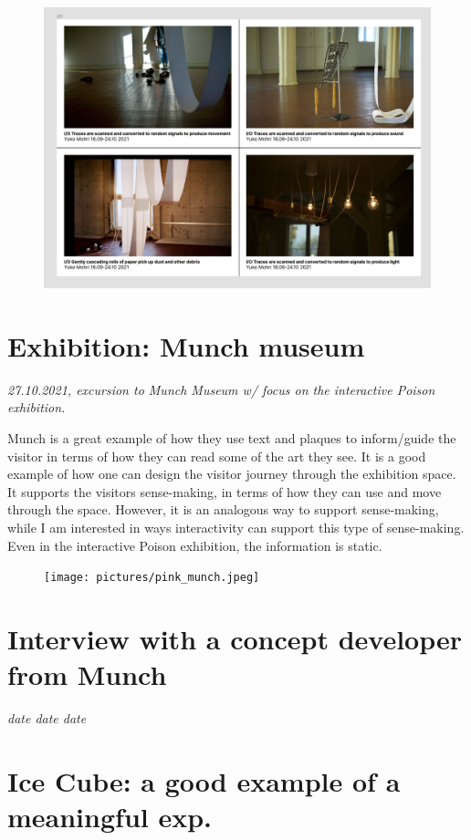 \begin{figure}[H]
\includegraphics[width=15cm]{pictures/yukomohri.png}
\centering 
\end{figure}

\section{Exhibition: Munch museum}
\par
\emph{27.10.2021, excursion to Munch Museum w/ focus on the interactive Poison exhibition.}
\par

Munch is a great example of how they use text and plaques to inform/guide the visitor in terms of how they can read some of the art they see. It is a good example of how one can design the visitor journey through the exhibition space. It supports the visitors sense-making, in terms of how they can use and move through the space. However, it is an analogous way to support sense-making, while I am interested in ways interactivity can support this type of sense-making. Even in the interactive Poison exhibition, the information is static.

\begin{figure}[h]
\texttt{[image: pictures/pink\_munch.jpeg]}
\centering 
\end{figure}

\section{Interview with a concept developer from Munch}
\par
\emph{date date date}
\par

\section{Ice Cube: a good example of a meaningful exp. }

